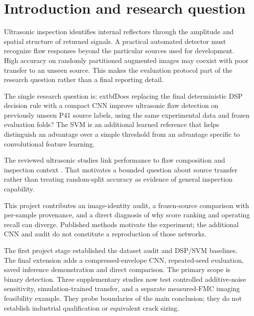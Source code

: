 \documentclass[11pt,a4paper]{article}
\begin{document}
\clearpage

\begingroup\small\setlength{\parskip}{0pt}\tableofcontents\endgroup

\clearpage

\FloatBarrier
\section{Introduction and research question}

Ultrasonic inspection identifies internal reflectors through the amplitude and spatial structure of returned signals. A practical automated detector must recognize flaw responses beyond the particular sources used for development. High accuracy on randomly partitioned augmented images may coexist with poor transfer to an unseen source. This makes the evaluation protocol part of the research question rather than a final reporting detail.

The single research question is: 	extbf{Does replacing the final deterministic DSP decision rule with a compact CNN improve ultrasonic flaw detection on previously unseen P41 source labels, using the same experimental data and frozen evaluation folds?} The SVM is an additional learned reference that helps distinguish an advantage over a simple threshold from an advantage specific to convolutional feature learning.

The reviewed ultrasonic studies link performance to flaw composition and inspection context \cite{ref1,ref2,ref5}. That motivates a bounded question about source transfer rather than treating random-split accuracy as evidence of general inspection capability.

This project contributes an image-identity audit, a frozen-source comparison with per-sample provenance, and a direct diagnosis of why score ranking and operating recall can diverge. Published methods motivate the experiment; the additional CNN and audit do not constitute a reproduction of those networks.

The first project stage established the dataset audit and DSP/SVM baselines. The final extension adds a compressed-envelope CNN, repeated-seed evaluation, saved inference demonstration and direct comparison. The primary scope is binary detection. Three supplementary studies now test controlled additive-noise sensitivity, simulation-trained transfer, and a separate measured-FMC imaging feasibility example. They probe boundaries of the main conclusion; they do not establish industrial qualification or equivalent crack sizing.
\end{document}
